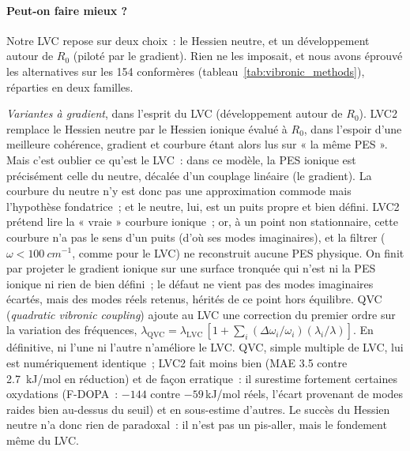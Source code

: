 \paragraph{Peut-on faire mieux ?}
Notre LVC repose sur deux choix~: le Hessien neutre, et un développement autour de $R_0$ (piloté par le gradient). Rien ne les imposait, et nous avons éprouvé les alternatives sur les 154 conformères (tableau~\ref{tab:vibronic_methods}), réparties en deux familles.

\emph{Variantes à gradient}, dans l'esprit du LVC (développement autour de $R_0$). LVC2 remplace le Hessien neutre par le Hessien ionique évalué à $R_0$, dans l'espoir d'une meilleure cohérence, gradient et courbure étant alors lus sur « la même PES ». Mais c'est oublier ce qu'est le LVC~: dans ce modèle, la PES ionique est précisément celle du neutre, décalée d'un couplage linéaire (le gradient). La courbure du neutre n'y est donc pas une approximation commode mais l'hypothèse fondatrice~; et le neutre, lui, est un puits propre et bien défini. LVC2 prétend lire la « vraie » courbure ionique~; or, à un point non stationnaire, cette courbure n'a pas le sens d'un puits (d'où ses modes imaginaires), et la filtrer ($\omega < \SI{100}{cm^{-1}}$, comme pour le LVC) ne reconstruit aucune PES physique. On finit par projeter le gradient ionique sur une surface tronquée qui n'est ni la PES ionique ni rien de bien défini~; le défaut ne vient pas des modes imaginaires écartés, mais des modes réels retenus, hérités de ce point hors équilibre. QVC (\emph{quadratic vibronic coupling}) ajoute au LVC une correction du premier ordre sur la variation des fréquences, $\lambda_{\text{QVC}} = \lambda_{\text{LVC}}\,[1 + \sum_i (\Delta\omega_i/\omega_i)(\lambda_i/\lambda)]$. En définitive, ni l'une ni l'autre n'améliore le LVC. QVC, simple multiple de LVC, lui est numériquement identique~; LVC2 fait moins bien (MAE \SI{3.5}{} contre \SI{2.7}{kJ/mol} en réduction) et de façon erratique~: il surestime fortement certaines oxydations (F-DOPA~: $-144$ contre $-59$\,kJ/mol réels, l'écart provenant de modes raides bien au-dessus du seuil) et en sous-estime d'autres. Le succès du Hessien neutre n'a donc rien de paradoxal~: il n'est pas un pis-aller, mais le fondement même du LVC.


